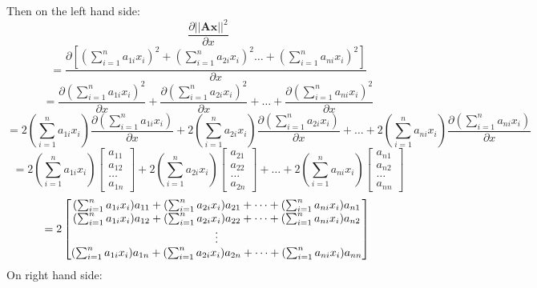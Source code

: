 \documentclass[12pt]{article}
\begin{document}
\begin{enumerate}
\begin{enumerate}
            Then on the left hand side: \\
            $$\frac{\partial ||\pmb{Ax}||^2}{\partial x} $$
            $$= \frac{\partial [(\sum_{i = 1}^n a_{1i}x_i)^2 + (\sum_{i = 1}^n a_{2i}x_i)^2 \dots + (\sum_{i = 1}^n a_{ni}x_i)^2 ]}{\partial x} $$
            $$= \frac{\partial (\sum_{i = 1}^n a_{1i}x_i)^2}{\partial x} + \frac{\partial (\sum_{i = 1}^n a_{2i}x_i)^2}{\partial x} + \dots + \frac{\partial (\sum_{i = 1}^n a_{ni}x_i)^2}{\partial x} $$
            $$= 2(\sum_{i = 1}^n a_{1i}x_i)\frac{\partial (\sum_{i = 1}^n a_{1i}x_i)}{\partial x} + 2(\sum_{i = 1}^n a_{2i}x_i)\frac{\partial (\sum_{i = 1}^n a_{2i}x_i)}{\partial x} + \dots + 2(\sum_{i = 1}^n a_{ni}x_i)\frac{\partial (\sum_{i = 1}^n a_{ni}x_i)}{\partial x} $$
            $$= 2(\sum_{i = 1}^n a_{1i}x_i)\begin{bmatrix}
                a_{11}\\ a_{12} \\ \dots \\ a_{1n}
            \end{bmatrix} + 
            2(\sum_{i = 1}^n a_{2i}x_i)\begin{bmatrix}
                a_{21}\\ a_{22} \\ \dots \\ a_{2n}
            \end{bmatrix} + \dots + 
            2(\sum_{i = 1}^n a_{ni}x_i)\begin{bmatrix}
                a_{n1}\\ a_{n2} \\ \dots \\ a_{nn}
            \end{bmatrix} $$
            $$= 2 \begin{bmatrix}
                (\sum_{i = 1}^n a_{1i}x_i) a_{11} + (\sum_{i = 1}^n a_{2i}x_i) a_{21} + \dots + (\sum_{i = 1}^n a_{ni}x_i) a_{n1} \\
                (\sum_{i = 1}^n a_{1i}x_i) a_{12} + (\sum_{i = 1}^n a_{2i}x_i) a_{22} + \dots + (\sum_{i = 1}^n a_{ni}x_i) a_{n2} \\
                \vdots \\
                (\sum_{i = 1}^n a_{1i}x_i) a_{1n} + (\sum_{i = 1}^n a_{2i}x_i) a_{2n} + \dots + (\sum_{i = 1}^n a_{ni}x_i) a_{nn} \\
            \end{bmatrix} \\$$
            On right hand side: \\

\end{enumerate}
\end{enumerate}
\end{document}

